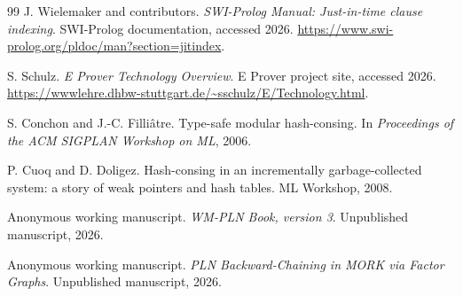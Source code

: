 \documentclass[11pt]{article}
\begin{document}
\begin{thebibliography}{99}
J. Wielemaker and contributors.
\newblock \emph{SWI-Prolog Manual: Just-in-time clause indexing}.
\newblock SWI-Prolog documentation, accessed 2026.
\newblock \url{https://www.swi-prolog.org/pldoc/man?section=jitindex}.

S. Schulz.
\newblock \emph{E Prover Technology Overview}.
\newblock E Prover project site, accessed 2026.
\newblock \url{https://wwwlehre.dhbw-stuttgart.de/~sschulz/E/Technology.html}.

S. Conchon and J.-C. Filli\^atre.
\newblock Type-safe modular hash-consing.
\newblock In \emph{Proceedings of the ACM SIGPLAN Workshop on ML}, 2006.

P. Cuoq and D. Doligez.
\newblock Hash-consing in an incrementally garbage-collected system: a story of weak pointers and hash tables.
\newblock ML Workshop, 2008.

Anonymous working manuscript.
\newblock \emph{WM-PLN Book, version 3}.
\newblock Unpublished manuscript, 2026.

Anonymous working manuscript.
\newblock \emph{PLN Backward-Chaining in MORK via Factor Graphs}.
\newblock Unpublished manuscript, 2026.

\end{thebibliography}
\end{document}
